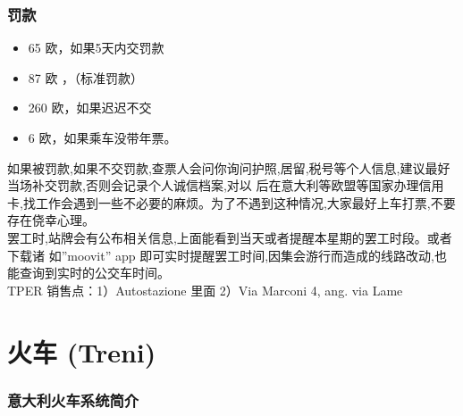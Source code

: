 \documentclass[3pt,a5paper,openright,twoside]{book}
\begin{document}
\subsubsection{罚款}
\begin{itemize}
\item  65 欧，如果5天内交罚款
\item  87 欧 ，（标准罚款）
\item  260 欧，如果迟迟不交
\item  6 欧，如果乘车没带年票。
\end{itemize}
如果被罚款,如果不交罚款,查票人会问你询问护照,居留,税号等个人信息,建议最好当场补交罚款,否则会记录个人诚信档案,对以 后在意大利等欧盟等国家办理信用卡,找工作会遇到一些不必要的麻烦。为了不遇到这种情况,大家最好上车打票,不要存在侥幸心理。\\

罢工时,站牌会有公布相关信息,上面能看到当天或者提醒本星期的罢工时段。或者下载诸 如”moovit” app 即可实时提醒罢工时间,因集会游行而造成的线路改动,也能查询到实时的公交车时间。\\
TPER 销售点：1）Autostazione 里面 2）Via Marconi 4, ang. via Lame



\section{火车 (Treni)}

\subsubsection*{意大利火车系统简介}
\end{document}
